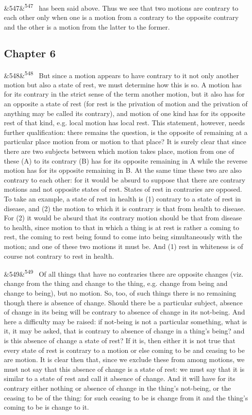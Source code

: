 \documentclass[12pt]{article}
\newcommand{\para}[1][]{\par\noindent\ifx&#1&\else\textsuperscript{\footnotesize #1}~\fi}
\begin{document}
\para[547] has been said above. Thus we see that two motions are contrary to each other only when one is a motion from a contrary to the opposite contrary and the other is a motion from the latter to the former.

\subsection*{Chapter 6}

\para[548] But since a motion appears to have contrary to it not only another motion but also a state of rest, we must determine how this is so. A motion has for its contrary in the strict sense of the term another motion, but it also has for an opposite a state of rest (for rest is the privation of motion and the privation of anything may be called its contrary), and motion of one kind has for its opposite rest of that kind, e.g. local motion has local rest. This statement, however, needs further qualification: there remains the question, is the opposite of remaining at a particular place motion from or motion to that place? It is surely clear that since there are two subjects between which motion takes place, motion from one of these (A) to its contrary (B) has for its opposite remaining in A while the reverse motion has for its opposite remaining in B. At the same time these two are also contrary to each other: for it would be absurd to suppose that there are contrary motions and not opposite states of rest. States of rest in contraries are opposed. To take an example, a state of rest in health is (1) contrary to a state of rest in disease, and (2) the motion to which it is contrary is that from health to disease. For (2) it would be absurd that its contrary motion should be that from disease to health, since motion to that in which a thing is at rest is rather a coming to rest, the coming to rest being found to come into being simultaneously with the motion; and one of these two motions it must be. And (1) rest in whiteness is of course not contrary to rest in health.

\para[549] Of all things that have no contraries there are opposite changes (viz. change from the thing and change to the thing, e.g. change from being and change to being), but no motion. So, too, of such things there is no remaining though there is absence of change. Should there be a particular subject, absence of change in its being will be contrary to absence of change in its not-being. And here a difficulty may be raised: if not-being is not a particular something, what is it, it may be asked, that is contrary to absence of change in a thing's being? and is this absence of change a state of rest? If it is, then either it is not true that every state of rest is contrary to a motion or else coming to be and ceasing to be are motion. It is clear then that, since we exclude these from among motions, we must not say that this absence of change is a state of rest: we must say that it is similar to a state of rest and call it absence of change. And it will have for its contrary either nothing or absence of change in the thing's not-being, or the ceasing to be of the thing: for such ceasing to be is change from it and the thing's coming to be is change to it.
\end{document}
